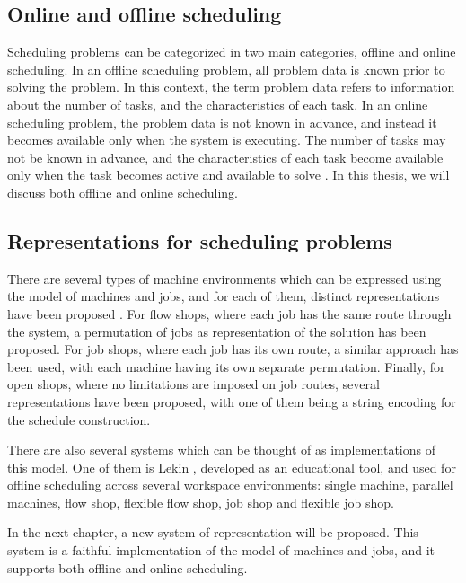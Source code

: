 \subsection{Online and offline scheduling}
\label{sec:offline_and_online_scheduling}
Scheduling problems can be categorized in two main categories, offline and online scheduling. In an offline scheduling problem, all problem data is known prior to solving the problem. In this context, the term problem data refers to information about the number of tasks, and the characteristics of each task. In an online scheduling problem, the problem data is not known in advance, and instead it becomes available only when the system is executing. The number of tasks may not be known in advance, and the characteristics of each task become available only when the task becomes active and available to solve \citep{pinedo2016scheduling}. In this thesis, we will discuss both offline and online scheduling.

\subsection{Representations for scheduling problems}
\label{sec:representations_for_scheduling_problems}
There are several types of machine environments which can be expressed using the model of machines and jobs, and for each of them, distinct representations have been proposed \citep{werner2013survey}. For flow shops, where each job has the same route through the system, a permutation of jobs as representation of the solution has been proposed. For job shops, where each job has its own route, a similar approach has been used, with each machine having its own separate permutation. Finally, for open shops, where no limitations are imposed on job routes, several representations have been proposed, with one of them being a string encoding for the schedule construction.

There are also several systems which can be thought of as implementations of this model. One of them is Lekin \citep{lekin}, developed as an educational tool, and used for offline scheduling across several workspace environments: single machine, parallel machines, flow shop, flexible flow shop, job shop and flexible job shop.

In the next chapter, a new system of representation will be proposed. This system is a faithful implementation of the model of machines and jobs, and it supports both offline and online scheduling.